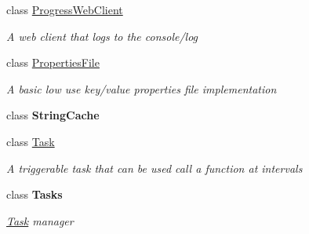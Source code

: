 \begin{DoxyCompactItemize}
class \hyperlink{class_o_t_a_1_1_misc_1_1_progress_web_client}{Progress\+Web\+Client}
\begin{DoxyCompactList}\small\item\em A web client that logs to the console/log \end{DoxyCompactList}\item 
class \hyperlink{class_o_t_a_1_1_misc_1_1_properties_file}{Properties\+File}
\begin{DoxyCompactList}\small\item\em A basic low use key/value properties file implementation \end{DoxyCompactList}\item 
class {\bfseries String\+Cache}
\item 
class \hyperlink{class_o_t_a_1_1_misc_1_1_task}{Task}
\begin{DoxyCompactList}\small\item\em A triggerable task that can be used call a function at intervals \end{DoxyCompactList}\item 
class {\bfseries Tasks}
\begin{DoxyCompactList}\small\item\em \hyperlink{class_o_t_a_1_1_misc_1_1_task}{Task} manager \end{DoxyCompactList}\end{DoxyCompactItemize}
